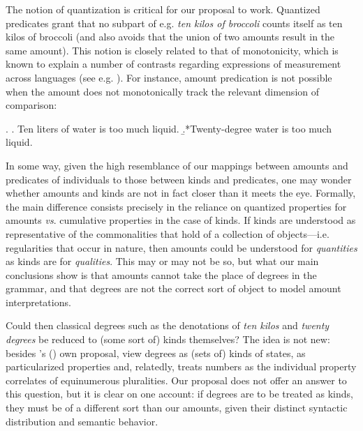 \documentclass[a4paper,12pt,twoside]{article}
\newcommand{\posscitet}[1]{\citeauthor{#1}'s (\citeyear{#1})}
\begin{document}
	The notion of quantization is critical for our proposal to work. Quantized predicates grant that no subpart of e.g. \textit{ten kilos of broccoli} counts itself as ten kilos of broccoli (and also avoids that the union of two amounts result in the same amount). This notion is closely related to that of monotonicity, which is known to explain a number of contrasts regarding expressions of measurement across languages (see e.g. \citealt{Schwarzschild:2006, Nakanishi:2007}). For instance, amount predication is not possible when the amount does not monotonically track the relevant dimension of comparison:
	
	\ex.
	\a. Ten liters of water is too much liquid. 
	\b.*Twenty-degree water is too much liquid.
	
	In some way, given the high resemblance of our mappings between amounts and predicates of individuals to those between kinds and predicates, one may wonder whether amounts and kinds are not in fact closer than it meets the eye. Formally, the main difference consists precisely in the reliance on quantized properties for amounts \textit{vs}. cumulative properties in the case of kinds. If kinds are understood as representative of the commonalities that hold of a collection of objects---i.e. regularities that occur in nature, then amounts could be understood for \textit{quantities} as kinds are for \textit{qualities}. This may or may not be so, but what our main conclusions show is that amounts cannot take the place of degrees in the grammar, and that degrees are not the correct sort of object to model amount interpretations.
	
	Could then classical degrees such as the denotations of \textit{ten kilos} and \textit{twenty degrees} be reduced to (some sort of) kinds themselves? The idea is not new: besides \posscitet{Scontras:2017} own proposal, \cite{Anderson&Morzycki:2015} view degrees as (sets of) kinds of states, \cite{Moltmann:2009} as particularized properties and, relatedly, \cite{Rothstein:2017} treats numbers as the individual property correlates of equinumerous pluralities. Our proposal does not offer an answer to this question, but it is clear on one account: if degrees are to be treated as kinds, they must be of a different sort than our amounts, given their distinct syntactic distribution and semantic behavior.	
	
\end{document}
